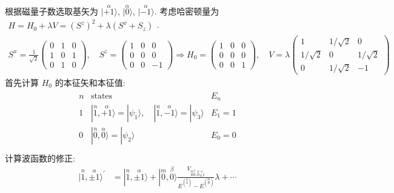 \documentclass[../../main.tex]{subfiles}
\begin{document}
\begin{enumerate}
    根据磁量子数选取基矢为 $|\stackrel{\alpha}{+1}\rangle$, $|\stackrel{\alpha}{0}\rangle$, $|\stackrel{\alpha}{-1}\rangle$. 考虑哈密顿量为 $\begin{aligned}
        H = H_{0} + \lambda V = (S^{z})^{2} + \lambda (S^{x} + S_{z})
    \end{aligned}$. 
    \begin{align*}
        S^{x} = \frac{1}{\sqrt{2}}\begin{pmatrix}
            0 & 1 & 0\\
            1 & 0 & 1\\
            0 & 1 & 0
        \end{pmatrix},\quad S^{z} = \begin{pmatrix}
            1 & 0 & 0\\
            0 & 0 & 0\\
            0 & 0 & -1
        \end{pmatrix}\Rightarrow H_{0} = \begin{pmatrix}
            1 & 0 & 0\\
            0 & 0 & 0\\
            0 & 0 & 1
        \end{pmatrix},\quad V = \lambda\begin{pmatrix}
            1 & 1/\sqrt{2} & 0\\
            1/\sqrt{2} & 0 & 1/\sqrt{2}\\
            0 & 1/\sqrt{2} & -1
        \end{pmatrix}
    \end{align*}
    首先计算 $H_{0}$ 的本征矢和本征值:
    \begin{align*}
        \begin{matrix}
            n & \text{states} & E_{n}\\
            1 & |\stackrel{n}{1}, \stackrel{\alpha}{+1}\rangle = |\psi_{1}\rangle,\quad |\stackrel{n}{1},\stackrel{\alpha}{-1}\rangle = |\psi_{3}\rangle & E_{1} = 1\\
            0 & |\stackrel{n}{0},\stackrel{\alpha}{0}\rangle = |\psi_{2}\rangle & E_{0} = 0\\
        \end{matrix}
    \end{align*}
    计算波函数的修正:
    \begin{align*}
        |\stackrel{n}{1},\stackrel{\alpha}{\pm 1}\rangle^{\prime} &= |\stackrel{n}{1},\stackrel{\alpha}{\pm 1}\rangle 
        + |\stackrel{m}{0},\stackrel{\beta}{0}\rangle\frac{V_{\stackrel{m}{0}\stackrel{\beta}{0},\stackrel{n}{0}\stackrel{\alpha}{\pm 1}}}{E^{(\stackrel{n}{1})} - E^{(\stackrel{m}{0})}}\lambda + \cdots\\

\end{align*}
\end{enumerate}
\end{document}
